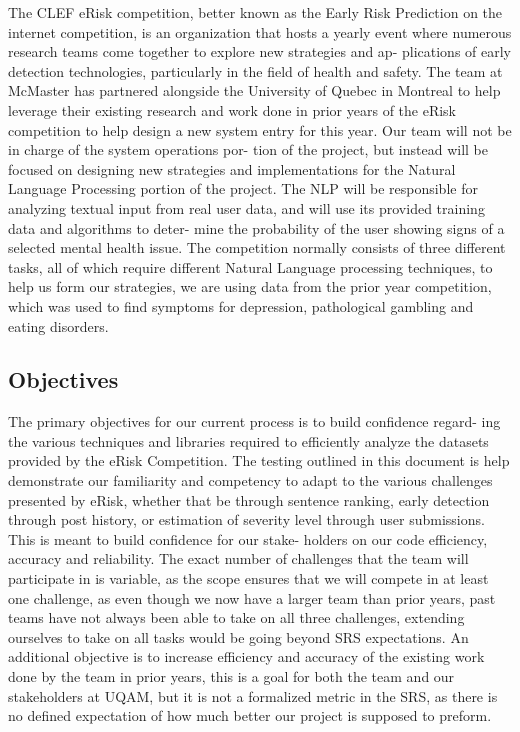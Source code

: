 \documentclass[12pt, titlepage]{article}
\begin{document}
The CLEF eRisk competition, better known as the Early Risk Prediction on
the internet competition, is an organization that hosts a yearly event where
numerous research teams come together to explore new strategies and ap-
plications of early detection technologies, particularly in the field of health
and safety. The team at McMaster has partnered alongside the University of
Quebec in Montreal to help leverage their existing research and work done
in prior years of the eRisk competition to help design a new system entry
for this year. Our team will not be in charge of the system operations por-
tion of the project, but instead will be focused on designing new strategies
and implementations for the Natural Language Processing portion of the
project. The NLP will be responsible for analyzing textual input from real
user data, and will use its provided training data and algorithms to deter-
mine the probability of the user showing signs of a selected mental health
issue. The competition normally consists of three different tasks, all of which
require different Natural Language processing techniques, to help us form our
strategies, we are using data from the prior year competition, which was used
to find symptoms for depression, pathological gambling and eating disorders.

\subsection{Objectives}

The primary objectives for our current process is to build confidence regard-
ing the various techniques and libraries required to efficiently analyze the
datasets provided by the eRisk Competition. The testing outlined in this
document is help demonstrate our familiarity and competency to adapt to
the various challenges presented by eRisk, whether that be through sentence
ranking, early detection through post history, or estimation of severity level
through user submissions. This is meant to build confidence for our stake-
holders on our code efficiency, accuracy and reliability. The exact number of
challenges that the team will participate in is variable, as the scope ensures
that we will compete in at least one challenge, as even though we now have a larger team than prior years, past teams have not always been able to take on
all three challenges, extending ourselves to take on all tasks would be going
beyond SRS expectations. An additional objective is to increase efficiency
and accuracy of the existing work done by the team in prior years, this is
a goal for both the team and our stakeholders at UQAM, but it is not a
formalized metric in the SRS, as there is no defined expectation of how much
better our project is supposed to preform.
\end{document}
